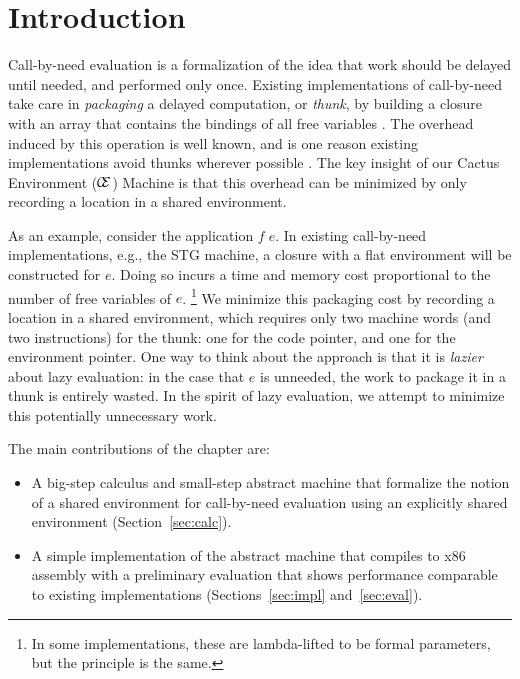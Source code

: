\section{Introduction}

Call-by-need evaluation is a formalization of the idea that work
should be delayed until needed, and performed only once.  Existing
implementations of call-by-need take care in \emph{packaging} a delayed
computation, or \emph{thunk}, by building a closure with an array that contains
the bindings of all free variables \cite{jonesstg,boquist1997grin}. The overhead
induced by this operation is well known, and is one reason existing implementations
avoid thunks wherever possible \cite{johnsson1984efficient}. The key insight of
our Cactus Environment ($\mathcal{\mathcal{C} \mskip -4mu \mathcal{E}}$) Machine is that this overhead can be
minimized by only recording a location in a shared environment.

As an example, consider the application $f \; e$. In existing call-by-need
implementations, e.g., the STG machine\cite{jonesstg}, a closure with a flat
environment will be constructed for $e$.  Doing so incurs a time and memory cost
proportional to the number of free variables of $e$. \footnote{In some
implementations, these are lambda-lifted to be formal parameters, but the
principle is the same.} We minimize this packaging cost by recording a
location in a shared environment, which requires only two
machine words (and two instructions) for the thunk: one for the code pointer,
and one for the environment pointer. One way to think about the approach is that
it is \emph{lazier} about lazy evaluation: in the case that $e$ is unneeded, the
work to package it in a thunk is entirely wasted. In the spirit of lazy
evaluation, we attempt to minimize this potentially unnecessary work.  

The main contributions of the chapter are:
\begin{itemize}
\item A big-step calculus and small-step abstract machine that formalize the
notion of a shared environment for call-by-need evaluation using an explicitly
shared environment (Section~\ref{sec:calc}).
\item A simple implementation of the abstract machine that compiles to x86
assembly with a preliminary evaluation that shows performance comparable to
existing implementations (Sections~\ref{sec:impl} and~\ref{sec:eval}).
\end{itemize}


